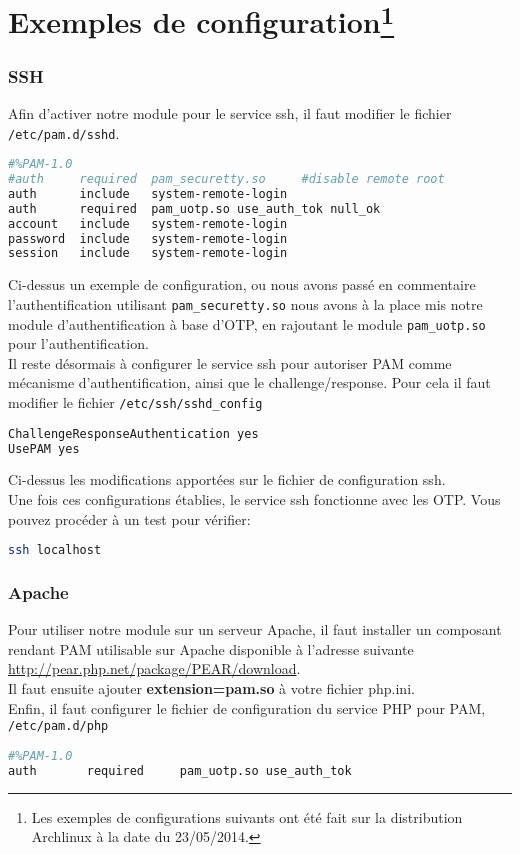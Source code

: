 \documentclass{"../../../res/univ-projet"}
\begin{document}
\newpage

\part[Exemples de configuration]{Exemples de configuration\footnote{Les exemples de configurations suivants ont été fait sur la distribution Archlinux à la date du 23/05/2014.}}
\section{SSH}
Afin d'activer notre module pour le service ssh, il faut modifier le fichier \verb?/etc/pam.d/sshd?.
\begin{lstlisting}[language=bash, backgroundcolor=\color{black}, basicstyle=\color{white}]
#%PAM-1.0
#auth     required  pam_securetty.so     #disable remote root
auth      include   system-remote-login
auth      required  pam_uotp.so use_auth_tok null_ok
account   include   system-remote-login
password  include   system-remote-login
session   include   system-remote-login
\end{lstlisting}
Ci-dessus un exemple de configuration, ou nous avons passé en commentaire l'authentification utilisant
\verb?pam_securetty.so? nous avons à la place mis notre module d'authentification à base d'OTP, en rajoutant le 
module \verb?pam_uotp.so? pour l'authentification.\\
Il reste désormais à configurer le service ssh pour autoriser PAM comme mécanisme d'authentification, 
ainsi que le challenge/response. Pour cela il faut modifier le fichier \verb?/etc/ssh/sshd_config?
\begin{lstlisting}[language=bash, backgroundcolor=\color{black}, basicstyle=\color{white}]
ChallengeResponseAuthentication yes
UsePAM yes
\end{lstlisting}
Ci-dessus les modifications apportées sur le fichier de configuration ssh.\\
Une fois ces configurations établies, le service ssh fonctionne avec les OTP.
Vous pouvez procéder à un test pour vérifier:
\begin{lstlisting}[language=bash, backgroundcolor=\color{black}, basicstyle=\color{white}]
ssh localhost
\end{lstlisting}

\newpage

\section{Apache}
Pour utiliser notre module sur un serveur Apache, il faut installer un composant rendant PAM utilisable
sur Apache disponible à l'adresse suivante 
\href{http://pear.php.net/package/PEAR/download}{http://pear.php.net/package/PEAR/download}.\\
Il faut ensuite ajouter \textbf{extension=pam.so} à votre fichier php.ini.\\
Enfin, il faut configurer le fichier de configuration du service PHP pour PAM, \verb?/etc/pam.d/php?
\begin{lstlisting}[language=bash, backgroundcolor=\color{black}, basicstyle=\color{white}]
#%PAM-1.0
auth       required     pam_uotp.so use_auth_tok
\end{lstlisting}
\end{document}
